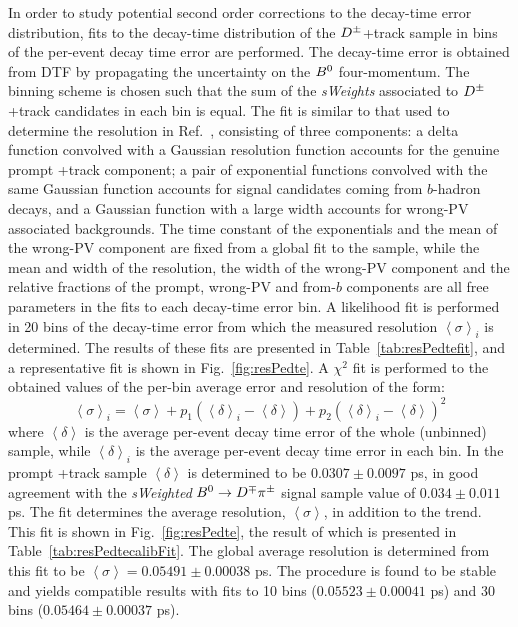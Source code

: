 In order to study potential second order corrections to the decay-time error distribution, fits to the decay-time distribution of the $D^\pm$+track sample in bins of the per-event decay time error are performed. The decay-time error is obtained from DTF by propagating the uncertainty on the $B^0$ four-momentum. The binning scheme is chosen such that the sum of the \emph{sWeights} associated to $D^\pm$+track candidates in each bin is equal. The fit is similar to that used to determine the resolution in Ref.~\cite{LHCb-PAPER-2014-059}, consisting of three components: a delta function convolved with a Gaussian resolution function accounts for the genuine prompt \Dpm+track component; a pair of exponential functions convolved with the same Gaussian function accounts for signal candidates coming from $b$-hadron decays, and a Gaussian function with a large width accounts for wrong-PV associated backgrounds. The time constant of the exponentials and the mean of the wrong-PV component are fixed from a global fit to the sample, while the mean and width of the resolution, the width of the wrong-PV component and the relative fractions of the prompt, wrong-PV and from-$b$ components are all free parameters in the fits to each decay-time error bin. A likelihood fit is performed in 20 bins of the decay-time error from which the measured resolution $\left<\sigma\right>_{i}$ is determined. The results of these fits are presented in Table~\ref{tab:resPedtefit}, and a representative fit is shown in Fig.~\ref{fig:resPedte}. A $\chi^{2}$ fit is performed to the obtained values of the per-bin average error and resolution of the form:
\begin{equation}
	\left<\sigma\right>_{i} = \left<\sigma\right> + p_{1} \left(\left<\delta\right>_{i} - \left<\delta\right>\right) + p_{2} \left(\left<\delta\right>_{i} - \left<\delta\right>\right)^{2}
\end{equation}
where $\left<\delta\right>$ is the average per-event decay time error of the whole (unbinned) sample, while $\left<\delta\right>_{i}$ is the average per-event decay time error in each bin. In the prompt \Dpm+track sample $\left<\delta\right>$ is determined to be $0.0307\pm0.0097$ ps, in good agreement with the \emph{sWeighted} $B^0\rightarrow D^\mp\pi^\pm$ signal sample value of $0.034\pm0.011$ ps. The fit determines the average resolution, $\left<\sigma\right>$, in addition to the trend. This fit is shown in Fig.~\ref{fig:resPedte}, the result of which is presented in Table~\ref{tab:resPedtecalibFit}. The global average resolution is determined from this fit to be $\left<\sigma\right>=0.05491\pm 0.00038$ ps. The procedure is found to be stable and yields compatible results with fits to 10 bins ($ 0.05523\pm 0.00041$ ps) and 30 bins ($0.05464\pm 0.00037$ ps). 

